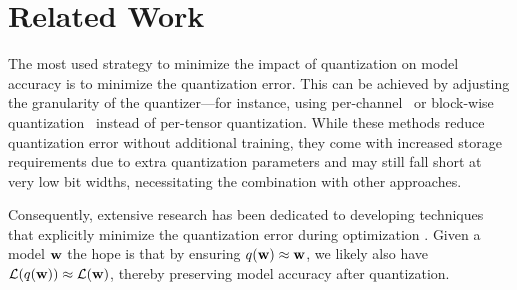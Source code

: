 

\section{Related Work}


The most used strategy to minimize the impact of quantization on model accuracy is to minimize the quantization error. This can be achieved by adjusting the granularity of the quantizer—for instance, using per-channel~\cite{Nagel_2019_ICCV} or block-wise quantization~\cite{dettmers2022bit} instead of per-tensor quantization. While these methods reduce quantization error without additional training, they come with increased storage requirements due to extra quantization parameters and may still fall short at very low bit widths, necessitating the combination with other approaches.

Consequently, extensive research has been dedicated to developing techniques that explicitly minimize the quantization error during optimization \cite{BridgeDeepLearning, minimizeQuantError, APTQ, Choi_2020, ImprovingLowBit, zhong2024mbquantnovelmultibranchtopology}. Given a model $\mathbf{w}$ the hope is that by ensuring \( q(\mathbf{w}) \approx \mathbf{w} \), we likely also have \( \mathcal{L}(q(\mathbf{w})) \approx \mathcal{L}(\mathbf{w}) \), thereby preserving model accuracy after quantization.

